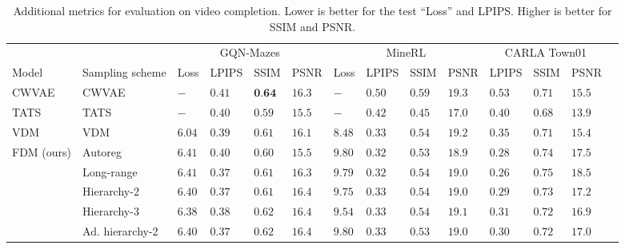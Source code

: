 \begin{table}[t]
  \tiny
  \caption{Additional metrics for evaluation on video completion. Lower is better for the test ``Loss'' and LPIPS. Higher is better for SSIM and PSNR.}
  \label{tab:fdm-extra-metrics}
  \centering
  \begin{tabular}{llllllllllllll}
    \toprule
    \multicolumn{1}{r}{} & & \multicolumn{4}{c}{GQN-Mazes}  & \multicolumn{4}{c}{MineRL}  & \multicolumn{3}{c}{CARLA Town01} \\
    \cmidrule(r){3-6} \cmidrule(r){7-10} \cmidrule(r){11-13}
    Model &  Sampling scheme    & Loss  & LPIPS  & SSIM   & PSNR  & Loss  & LPIPS   & SSIM   &  PSNR   & LPIPS     & SSIM  & PSNR \\
    \midrule
    \multirow{1}{*}{CWVAE~\citep{saxena2021clockwork}}& CWVAE
    & $-   $ & $0.41$  & $\textbf{0.64}$  & $16.3$  & $-   $  & $0.50$  & $\mathbf{0.59}$  & $\mathbf{19.3}$  & $0.53$  & $0.71$  & $15.5$        \\
    \midrule
    \multirow{1}{*}{TATS~\citep{ge2022long}}& TATS
    & $-$ & $0.40$  & $0.59$  & $15.5$  & $-$  & $0.42$  & $0.45$  & $17.0$  & $0.40$  & $0.68$  & $13.9$        \\
    \midrule
    \multirow{1}{*}{VDM~\citep{ho2022video}}& VDM
    & $\mathbf{6.04}$ & $0.39$  & $0.61$  & $16.1$  & $\mathbf{8.48}$  & $0.33$  & $0.54$  & $19.2$  & $0.35$  & $0.71$  & $15.4$        \\
    \midrule
\multirow{5}{*}{FDM (ours)}   &  Autoreg
    & $6.41$ & $0.40$  & $0.60$  & $15.5$  & $9.80$  & $\mathbf{0.32}$  & $0.53$  & $18.9$  & $0.28$  & $0.74$  & $17.5$        \\
                            &  Long-range
    & $6.41$ & $\mathbf{0.37}$  & $0.61$  & $16.3$  & $9.79$  & $\mathbf{0.32}$  & $0.54$  & $19.0$  & $\mathbf{0.26}$  & $\mathbf{0.75}$  & $\mathbf{18.5}$        \\
                            &  Hierarchy-2
    & $6.40$ & $\mathbf{0.37}$  & $0.61$  & $\mathbf{16.4}$  & $9.75$  & $0.33$  & $0.54$  & $19.0$  & $0.29$  & $0.73$  & $17.2$        \\
                            &  Hierarchy-3
    & $6.38$ & $0.38$  & $0.62$  & $\mathbf{16.4}$  & $9.54$  & $0.33$  & $0.54$  & $19.1$  & $0.31$  & $0.72$  & $16.9$        \\
                            &  Ad. hierarchy-2
    & $6.40$ & $\mathbf{0.37}$  & $0.62$  & $\mathbf{16.4}$  & $9.80$  & $0.33$  & $0.53$  & $19.0$  & $0.30$  & $0.72$  & $17.0$        \\
    \bottomrule
  \end{tabular}
\end{table}


